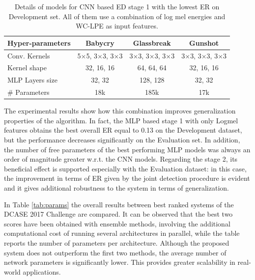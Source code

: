 \begin{table}[b]
	\centering	
		\begin{tabular}{|l|c|c|c|}
			\hline
			Hyper-parameters & Babycry                            & Glassbreak                         & Gunshot                            \\ \hline
			Conv. Kernels    & 5$\times$5, 3$\times$3, 3$\times$3 & 3$\times$3, 3$\times$3, 3$\times$3 & 3$\times$3, 3$\times$3, 3$\times$3 \\
			Kernel shape     & 32, 16, 16                         & 64, 64, 64                         & 32, 16, 16                         \\
			MLP Layers size  & 32, 32                             & 128, 128                           & 32, 32                             \\ \hline
			\# Parameters    & 18k                            & 185k                           & 17k                           \\ \hline
		\end{tabular}
	\caption[Rare Sound Event Detection - ED Stage 1 Best models]{Details of models for CNN based ED stage 1 with the lowest ER on Development set. All of them use a combination of log mel energies and WC-LPE as input features.}
	\label{tab:CNN_details}
\end{table}
The experimental results show how this combination improves generalization properties of the algorithm. In fact, the MLP based stage 1 with only Logmel features obtains the best overall ER equal to 0.13 on the Development dataset, but the performance decreases significantly on the Evaluation set. In addition, the number of free parameters of the best performing MLP models was always an order of magnitude greater w.r.t. the CNN models. Regarding the stage 2, its beneficial effect is supported especially with the Evaluation dataset: in this case, the improvement in terms of ER given by the joint detection procedure is evident and it gives additional robustness to the system in terms of generalization.

In Table \ref{tab:params} the overall results between best ranked systems of the DCASE 2017 Challenge are compared. It can be observed that the best two scores have been obtained with ensemble methods, involving the additional computational cost of running several architectures in parallel, while the table reports the number of parameters per architecture. Although the proposed system does not outperform the first two methods, the average number of network parameters is significantly lower. This provides greater scalability in real-world applications.

